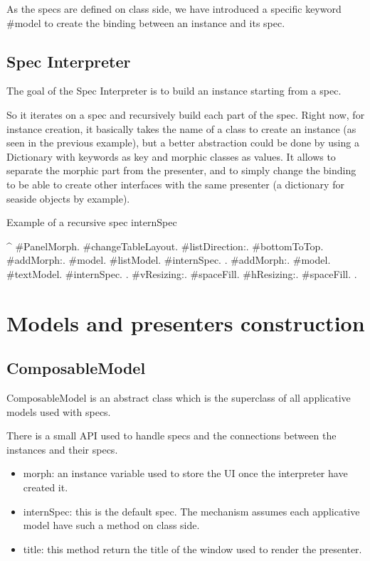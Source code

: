 \documentclass[a4paper,10pt,twoside]{book}
\begin{document}
As the specs are defined on class side, we have introduced a specific keyword \#model to create the binding between an instance and its spec.

\subsection{Spec Interpreter}

The goal of the Spec Interpreter is to build an instance starting from a spec.

So it iterates on a spec and recursively build each part of the spec.
Right now, for instance creation, it basically takes the name of a class to create an instance (as seen in the previous example), but a better abstraction could be done by using a Dictionary with keywords as key and morphic classes as values. It allows to separate the morphic part from the presenter, and to simply change the binding to be able to create other interfaces with the same presenter (a dictionary for seaside objects by example).

\begin{method}{Example of a recursive spec}
internSpec

	^	{  #PanelMorph.
			#changeTableLayout.
			#listDirection:. #bottomToTop.
			#addMorph:.   { #model. #listModel. #internSpec.	 }.
			#addMorph:.	  { #model. #textModel. #internSpec. 	}.
			#vResizing:. 	#spaceFill.
			#hResizing:. 	#spaceFill.	}.
\end{method} 

\section{Models and presenters construction}

\subsection{ComposableModel}

ComposableModel is an abstract class which is the superclass of all applicative models used with specs.

There is a small API used to handle specs and the connections between the instances and their specs.

\begin{itemize}
	\item morph: an instance variable used to store the UI once the interpreter have created it.
	\item internSpec: this is the default spec. The mechanism assumes each applicative model have such a method on class side.
	\item title: this method return the title of the window used to render the presenter.
\end{itemize}
\end{document}
